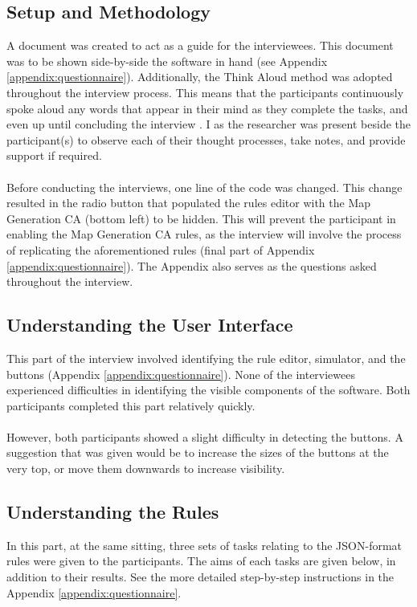 \subsection{Setup and Methodology}
A document was created to act as a guide for the interviewees. This document was to be shown side-by-side the software in hand (see Appendix \ref{appendix:questionnaire}). Additionally, the Think Aloud method was adopted throughout the interview process. This means that the participants continuously spoke aloud any words that appear in their mind as they complete the tasks, and even up until concluding the interview \cite{charters2003thinkaloud}. I as the researcher was present beside the participant(s) to observe each of their thought processes, take notes, and provide support if required. 
\\ \\
Before conducting the interviews, one line of the code was changed. This change resulted in the radio button that populated the rules editor with the Map Generation CA (bottom left) to be hidden. This will prevent the participant in enabling the Map Generation CA rules, as the interview will involve the process of replicating the aforementioned rules (final part of Appendix \ref{appendix:questionnaire}). The Appendix also serves as the questions asked throughout the interview.

\subsection{Understanding the User Interface}
This part of the interview involved identifying the rule editor, simulator, and the buttons (Appendix \ref{appendix:questionnaire}). None of the interviewees experienced difficulties in identifying the visible components of the software. Both participants completed this part relatively quickly.
\\ \\
However, both participants showed a slight difficulty in detecting the buttons. A suggestion that was given would be to increase the sizes of the buttons at the very top, or move them downwards to increase visibility. 
\subsection{Understanding the Rules}
In this part, at the same sitting, three sets of tasks relating to the JSON-format rules were given to the participants. The aims of each tasks are given below, in addition to their results. See the more detailed step-by-step instructions in the Appendix \ref{appendix:questionnaire}.
\newpage
